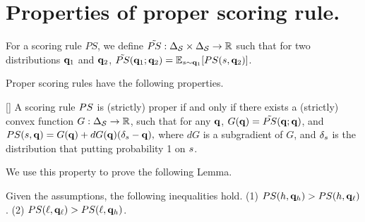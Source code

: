 \section{Properties of proper scoring rule.}

For a scoring rule $PS$, we define $\tilde{PS}: \Delta_{\mathcal{S}}\times \Delta_{\mathcal{S}} \to \mathbb{R}$ such that for two distributions $\mathbf{q}_1$ and $\mathbf{q}_2$, $\tilde{PS}(\mathbf{q}_1; \mathbf{q}_2) = \mathbb{E}_{s \sim \mathbf{q}_1}[PS(s, \mathbf{q}_2)]$.

Proper scoring rules have the following properties. 
\begin{theorem}
    \label{thm:psr}
    [\citep{hendrickson1971score}]
    A scoring rule $PS$ is (strictly) proper if and only if there exists a (strictly) convex function $G: \Delta_{\mathcal{S}} \to \mathbb{R}$, such that for any $\mathbf{q}$, $G(\mathbf{q}) = \tilde{PS}(\mathbf{q}; \mathbf{q})$, and $PS(s, \mathbf{q}) =G(\mathbf{q}) + dG (\mathbf{q}) (\delta_{s} - \mathbf{q}),$ where $dG$ is a subgradient of $G$, and $\delta_{s}$ is the distribution that putting probability 1 on $s$.
\end{theorem}

We use this property to prove the following Lemma.

\begin{lemma}
    \label{lem:pr_psr}
    Given the assumptions, the following inequalities hold. 
    (1) $PS(h, \mathbf{q}_h) > PS(h,  \mathbf{q}_{\ell})$. (2) $PS(\ell, \mathbf{q}_{\ell}) > PS(\ell, \mathbf{q}_h)$.  
\end{lemma}

